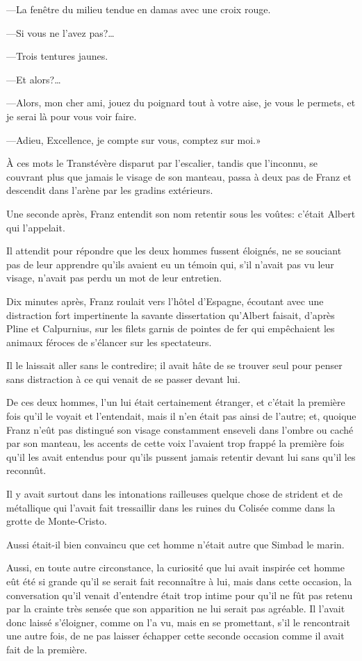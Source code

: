 —La fenêtre du milieu tendue en damas avec une croix rouge. 

—Si vous ne l'avez pas?\dots 

—Trois tentures jaunes. 

—Et alors?\dots 

—Alors, mon cher ami, jouez du poignard tout à votre aise, je vous le permets, et je serai là pour vous voir faire. 

—Adieu, Excellence, je compte sur vous, comptez sur moi.» 

À ces mots le Transtévère disparut par l'escalier, tandis que l'inconnu, se couvrant plus que jamais le visage de son manteau, passa à deux pas de Franz et descendit dans l'arène par les gradins extérieurs. 

Une seconde après, Franz entendit son nom retentir sous les voûtes: c'était Albert qui l'appelait. 

Il attendit pour répondre que les deux hommes fussent éloignés, ne se souciant pas de leur apprendre qu'ils avaient eu un témoin qui, s'il n'avait pas vu leur visage, n'avait pas perdu un mot de leur entretien. 

Dix minutes après, Franz roulait vers l'hôtel d'Espagne, écoutant avec une distraction fort impertinente la savante dissertation qu'Albert faisait, d'après Pline et Calpurnius, sur les filets garnis de pointes de fer qui empêchaient les animaux féroces de s'élancer sur les spectateurs. 

Il le laissait aller sans le contredire; il avait hâte de se trouver seul pour penser sans distraction à ce qui venait de se passer devant lui. 

De ces deux hommes, l'un lui était certainement étranger, et c'était la première fois qu'il le voyait et l'entendait, mais il n'en était pas ainsi de l'autre; et, quoique Franz n'eût pas distingué son visage constamment enseveli dans l'ombre ou caché par son manteau, les accents de cette voix l'avaient trop frappé la première fois qu'il les avait entendus pour qu'ils pussent jamais retentir devant lui sans qu'il les reconnût.  

Il y avait surtout dans les intonations railleuses quelque chose de strident et de métallique qui l'avait fait tressaillir dans les ruines du Colisée comme dans la grotte de Monte-Cristo. 

Aussi était-il bien convaincu que cet homme n'était autre que Simbad le marin. 

Aussi, en toute autre circonstance, la curiosité que lui avait inspirée cet homme eût été si grande qu'il se serait fait reconnaître à lui, mais dans cette occasion, la conversation qu'il venait d'entendre était trop intime pour qu'il ne fût pas retenu par la crainte très sensée que son apparition ne lui serait pas agréable. Il l'avait donc laissé s'éloigner, comme on l'a vu, mais en se promettant, s'il le rencontrait une autre fois, de ne pas laisser échapper cette seconde occasion comme il avait fait de la première. 

